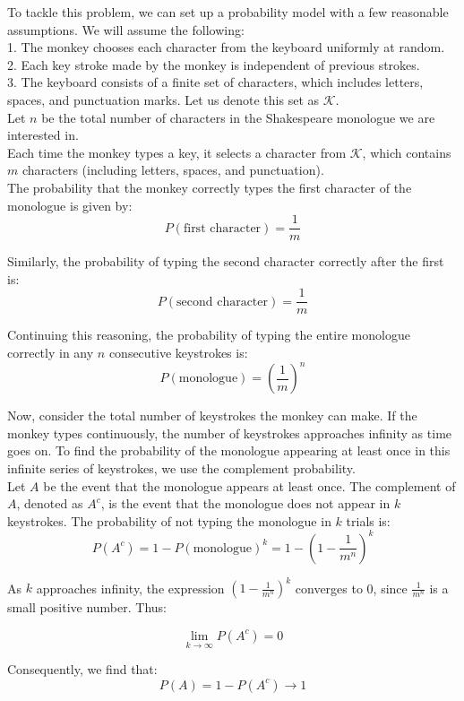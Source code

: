 \begin{solution}
    To tackle this problem, we can set up a probability model with a few reasonable assumptions. We will assume the following:\\

    1. The monkey chooses each character from the keyboard uniformly at random.\\
    2. Each key stroke made by the monkey is independent of previous strokes.\\
    3. The keyboard consists of a finite set of characters, which includes letters, spaces, and punctuation marks. Let us denote this set as $\mathcal{K}$.\\
    
    Let \( n \) be the total number of characters in the Shakespeare monologue we are interested in. \\
    
    Each time the monkey types a key, it selects a character from $\mathcal{K}$, which contains \( m \) characters (including letters, spaces, and punctuation).\\
    
    The probability that the monkey correctly types the first character of the monologue is given by:
    \[
    P(\text{first character}) = \frac{1}{m}
    \]
    
    Similarly, the probability of typing the second character correctly after the first is:
    \[
    P(\text{second character}) = \frac{1}{m}
    \]
    
    Continuing this reasoning, the probability of typing the entire monologue correctly in any \( n \) consecutive keystrokes is:
    \[
    P(\text{monologue}) = \left( \frac{1}{m} \right)^n
    \]
    
    Now, consider the total number of keystrokes the monkey can make. If the monkey types continuously, the number of keystrokes approaches infinity as time goes on. To find the probability of the monologue appearing at least once in this infinite series of keystrokes, we use the complement probability.\\
    
    Let \( A \) be the event that the monologue appears at least once. The complement of \( A \), denoted as \( A^c \), is the event that the monologue does not appear in \( k \) keystrokes. The probability of not typing the monologue in \( k \) trials is:
    \[
    P(A^c) = 1 - P(\text{monologue})^k = 1 - \left(1 - \frac{1}{m^n}\right)^k
    \]
    
    As \( k \) approaches infinity, the expression \( \left(1 - \frac{1}{m^n}\right)^k \) converges to 0, since \( \frac{1}{m^n} \) is a small positive number. Thus:
    
    \[
    \lim_{k \to \infty} P(A^c) = 0
    \]
    
    Consequently, we find that:
    \[
    P(A) = 1 - P(A^c) \to 1
    \]    
\end{solution}

